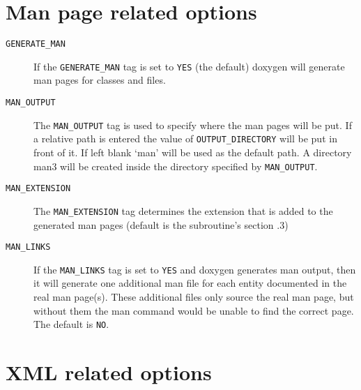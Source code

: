 \hypertarget{config_man_output}{}\section{Man page related options}\label{config_man_output}
\label{config_cfg_generate_man}
\hypertarget{config_cfg_generate_man}{}
 \begin{description}
\item[{\tt GENERATE\_\-MAN} ] If the {\tt GENERATE\_\-MAN} tag is set to {\tt YES} (the default) doxygen will generate man pages for classes and files.

\label{config_cfg_man_output}
\hypertarget{config_cfg_man_output}{}
 \item[{\tt MAN\_\-OUTPUT} ] The {\tt MAN\_\-OUTPUT} tag is used to specify where the man pages will be put. If a relative path is entered the value of {\tt OUTPUT\_\-DIRECTORY} will be put in front of it. If left blank `man' will be used as the default path. A directory man3 will be created inside the directory specified by {\tt MAN\_\-OUTPUT}.

\label{config_cfg_man_extension}
\hypertarget{config_cfg_man_extension}{}
 \item[{\tt MAN\_\-EXTENSION} ] The {\tt MAN\_\-EXTENSION} tag determines the extension that is added to the generated man pages (default is the subroutine's section .3)

\label{config_cfg_man_links}
\hypertarget{config_cfg_man_links}{}
 \item[{\tt MAN\_\-LINKS} ] If the {\tt MAN\_\-LINKS} tag is set to {\tt YES} and doxygen generates man output, then it will generate one additional man file for each entity documented in the real man page(s). These additional files only source the real man page, but without them the man command would be unable to find the correct page. The default is {\tt NO}.

\end{description}
\hypertarget{config_xml_output}{}\section{XML related options}\label{config_xml_output}
\label{config_cfg_generate_xml}
\hypertarget{config_cfg_generate_xml}{}
